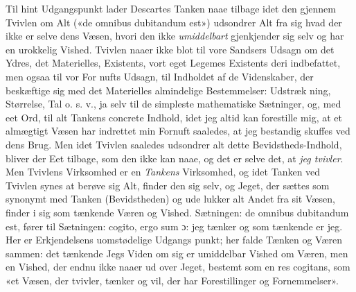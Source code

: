 \documentclass[12pt,a4paper]{book}
\begin{document}
Til hint Udgangspunkt lader Descartes Tanken naae tilbage
idet den gjennem Tvivlen om Alt («de omnibus dubitandum
est») udsondrer Alt fra sig hvad der ikke er selve dens Væsen,
hvori den ikke \emph{umiddelbart} gjenkjender sig selv og har
en urokkelig Vished. Tvivlen naaer ikke blot til vore Sandsers
Udsagn om det Ydres, det Materielles, Existents, vort eget
Legemes Existents deri indbefattet, men ogsaa til vor For\-%
nufts Udsagn, til Indholdet af de Videnskaber, der beskæftige
sig med det Materielles almindelige Bestemmelser: Udstræk\-%
ning, Størrelse, Tal o. s. v., ja selv til de simpleste mathematiske
Sætninger, og, med eet Ord, til alt Tankens concrete Indhold,
idet jeg altid kan forestille mig, at et almægtigt Væsen har
indrettet min Fornuft saaledes, at jeg bestandig skuffes ved
dens Brug. Men idet Tvivlen saaledes udsondrer alt dette
Bevidstheds-Indhold, bliver der Eet tilbage, som den ikke kan
naae, og det er selve det, at \emph{jeg tvivler}. Men Tvivlens
Virksomhed er en \emph{Tankens} Virksomhed, og idet Tanken ved
Tvivlen synes at berøve sig Alt, finder den sig selv, og Jeget,
der sættes som synonymt med Tanken (Bevidstheden) og ude\-%
lukker alt Andet fra sit Væsen, finder i sig som tænkende
Væren og Vished. Sætningen: de omnibus dubitandum est,
fører til Sætningen: cogito, ergo sum ɔ: jeg tænker og som
tænkende er jeg. Her er Erkjendelsens uomstødelige Udgangs\-%
punkt; her falde Tænken og Væren sammen: det tænkende
Jegs Viden om sig er umiddelbar Vished om Væren, men en
Vished, der endnu ikke naaer ud over Jeget, bestemt som en
res cogitans, som «et Væsen, der tvivler, tænker og vil, der har
Forestillinger og Fornemmelser».
\end{document}
